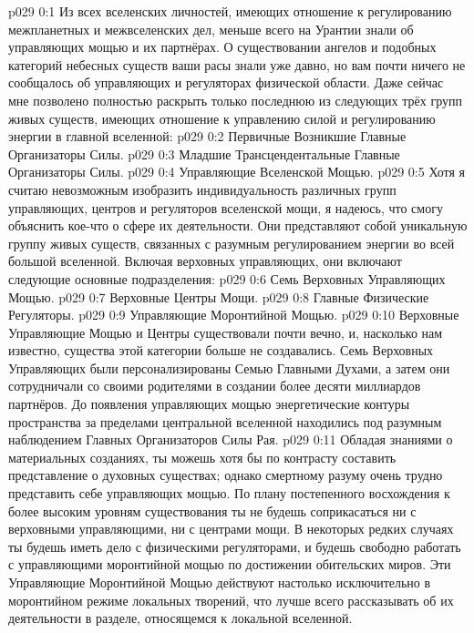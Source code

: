 \author{Всеобщий Цензор}
\vs p029 0:1 Из всех вселенских личностей, имеющих отношение к регулированию межпланетных и межвселенских дел, меньше всего на Урантии знали об управляющих мощью и их партнёрах. О существовании ангелов и подобных категорий небесных существ ваши расы знали уже давно, но вам почти ничего не сообщалось об управляющих и регуляторах физической области. Даже сейчас мне позволено полностью раскрыть только последнюю из следующих трёх групп живых существ, имеющих отношение к управлению силой и регулированию энергии в главной вселенной:
\vs p029 0:2 Первичные Возникшие Главные Организаторы Силы.
\vs p029 0:3 Младшие Трансцендентальные Главные Организаторы Силы.
\vs p029 0:4 Управляющие Вселенской Мощью.
\vs p029 0:5 \pc Хотя я считаю невозможным изобразить индивидуальность различных групп управляющих, центров и регуляторов вселенской мощи, я надеюсь, что смогу объяснить кое\hyp{}что о сфере их деятельности. Они представляют собой уникальную группу живых существ, связанных с разумным регулированием энергии во всей большой вселенной. Включая верховных управляющих, они включают следующие основные подразделения:
\vs p029 0:6 Семь Верховных Управляющих Мощью.
\vs p029 0:7 Верховные Центры Мощи.
\vs p029 0:8 Главные Физические Регуляторы.
\vs p029 0:9 Управляющие Моронтийной Мощью.
\vs p029 0:10 \pc Верховные Управляющие Мощью и Центры существовали почти вечно, и, насколько нам известно, существа этой категории больше не создавались. Семь Верховных Управляющих были персонализированы Семью Главными Духами, а затем они сотрудничали со своими родителями в создании более десяти миллиардов партнёров. До появления управляющих мощью энергетические контуры пространства за пределами центральной вселенной находились под разумным наблюдением Главных Организаторов Силы Рая.
\vs p029 0:11 Обладая знаниями о материальных созданиях, ты можешь хотя бы по контрасту составить представление о духовных существах; однако смертному разуму очень трудно представить себе управляющих мощью. По плану постепенного восхождения к более высоким уровням существования ты не будешь соприкасаться ни с верховными управляющими, ни с центрами мощи. В некоторых редких случаях ты будешь иметь дело с физическими регуляторами, и будешь свободно работать с управляющими моронтийной мощью по достижении обительских миров. Эти Управляющие Моронтийной Мощью действуют настолько исключительно в моронтийном режиме локальных творений, что лучше всего рассказывать об их деятельности в разделе, относящемся к локальной вселенной.
